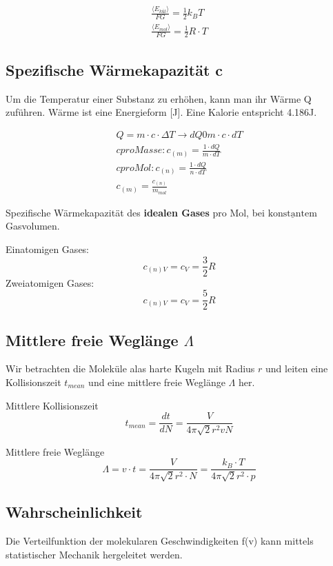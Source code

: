 \[\boxed{\begin{aligned}
		\frac{\langle E_{kül} \rangle}{FG}= \frac{1}{2}k_{B}T
		\\
		\frac{\langle E_{mol} \rangle}{FG}= \frac{1}{2}R \cdot T
	\end{aligned}}\]	

\subsection{Spezifische Wärmekapazität c}
Um die Temperatur einer Substanz zu erhöhen, kann man ihr W\"arme Q zuf\"uhren. W\"arme ist eine Energieform [J]. Eine Kalorie entspricht 4.186J.

\[\boxed{\begin{aligned}	
		Q=m \cdot c \cdot \Delta T \rightarrow dQ0m \cdot c \cdot dT
		\\
		c pro Masse: c_{(m)}=\frac{1 \cdot dQ}{m \cdot  dT}
		\\
		c pro Mol: c_{(n)}=\frac{1 \cdot dQ}{n \cdot  dT}		
		\\
		c_{(m)}=\frac{c_{(n)}}{m_{mol}}
	\end{aligned}}\]\newline
	
Spezifische Wärmekapazität des \textbf{idealen Gases} pro Mol, bei $\underline{\mathrm{konstantem}}$ Gasvolumen.

		Einatomigen Gases:
		\[\boxed{			
			c_{(n)V}=c_{V}=\frac{3}{2}R
		}\]\newline
		Zweiatomigen Gases:
		\[\boxed{	
			c_{(n)V}=c_{V}=\frac{5}{2}R							
		}\]\newline

\subsection{Mittlere freie Weglänge $\Lambda$}
Wir betrachten die Moleküle alas harte Kugeln mit Radius $r$ und leiten eine Kollisionszeit $t_{mean}$ und eine mittlere freie Weglänge $\Lambda$ her.

Mittlere Kollisionszeit
\[ t_{mean} = \frac{dt}{dN}= \frac{V}{4 \pi \sqrt{2}r^2vN} \]
	
Mittlere freie Wegl\"ange
\[ \Lambda =v \cdot t= \frac{V}{4 \pi \sqrt{2}r^2 \cdot N}=  \frac{k_{B} \cdot T}{4 \pi \sqrt{2}r^2 \cdot p} \]

\subsection{Wahrscheinlichkeit}
Die Verteilfunktion der molekularen Geschwindigkeiten f(v) kann mittels statistischer Mechanik hergeleitet werden.

